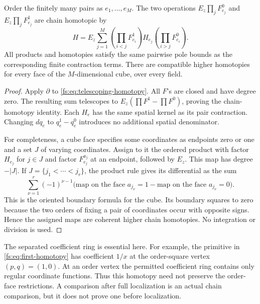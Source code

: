 \begin{theorem}\label{fs:thm:cubical}
Order the finitely many pairs as \(e_1,\ldots,e_M\).
The two operations \(E_z\prod_jF_{e_j}^0\) and
\(E_z\prod_jF_{e_j}^1\) are chain homotopic by
\begin{equation}\label{fs:eq:telescoping-homotopy}
 H=E_z\sum_{j=1}^M
 \left(\prod_{i<j}F_{e_i}^1\right)H_{e_j}
 \left(\prod_{i>j}F_{e_i}^0\right).
\end{equation}
All products and homotopies satisfy the same pairwise pole bounds
as the corresponding finite contraction terms.
There are compatible higher homotopies for every face of the
\(M\)-dimensional cube, over every field.
\end{theorem}

\begin{proof}
Apply \(\partial\) to \eqref{fs:eq:telescoping-homotopy}.
All \(F\)'s are closed and have degree zero.  The resulting sum
telescopes to
\(E_z(\prod F^1-\prod F^0)\), proving the chain-homotopy identity.
Each \(H_e\) has the same spatial kernel as its pair contraction.
Changing \(dq_e\) to \(q_e^1-q_e^0\) introduces no additional
spatial denominator.

For completeness, a cube face specifies some coordinates as endpoints
zero or one and a set \(J\) of varying coordinates.  Assign to it
the ordered product with factor \(H_{e_j}\) for \(j\in J\)
and factor \(F_{e_j}^{a_j}\) at an endpoint, followed by \(E_z\).
This map has degree \(-|J|\).  If
\(J=\{j_1<\cdots<j_r\}\), the product rule gives its differential
as the sum
\[
 \sum_{\nu=1}^r(-1)^{\nu-1}
 \bigl(\text{map on the face }a_{j_\nu}=1
       -\text{map on the face }a_{j_\nu}=0\bigr).
\]
This is the oriented boundary formula for the cube.
Its boundary squares to zero because the two orders of fixing a
pair of coordinates occur with opposite signs.
Hence the assigned maps are coherent higher chain homotopies.
No integration or division is used.
\end{proof}

The separated coefficient ring is essential here.  For example,
the primitive in \eqref{fs:eq:first-homotopy} has coefficient
\(1/x\) at the order-square vertex \((p,q)=(1,0)\).
At an order vertex the permitted coefficient ring contains only
regular coordinate functions.  Thus this homotopy need not preserve
the order-face restrictions.  A comparison after full localization
is an actual chain comparison, but it does not prove one before
localization.

